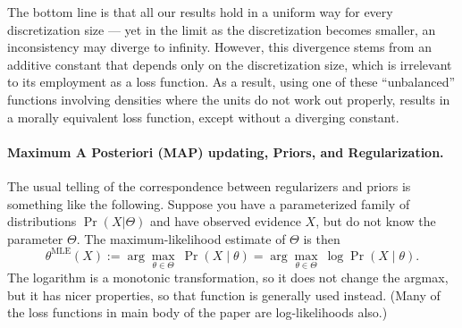 \begin{subappendices}
The bottom line is that all our results hold in a uniform way for every discretization size --- yet in the limit as the discretization becomes smaller, an inconsistency may diverge to infinity.
However, this divergence stems from an additive constant that depends only on the discretization size, which is irrelevant to its employment as a loss function.
As a result, using one of these ``unbalanced'' functions involving densities where the units do not work out properly, results in a morally equivalent loss function, except without a diverging constant.
%


\paragraph{Maximum A Posteriori (MAP) updating, Priors, and Regularization.}
    \label{appendix:MAP-and-priors}

The usual telling of the correspondence between regularizers and priors is something like the following.
Suppose you have a parameterized family of distributions
$\Pr(X|\Theta)$
and have observed evidence $X$, but do not know the parameter $\Theta$.
The maximum-likelihood estimate of $\Theta$ is then
\[
	\theta^{\mathrm{MLE}}(X) := \arg\max_{\theta\in \Theta}~  \Pr(X \mid \theta)
		= \arg\max_{\theta\in \Theta} ~ \log \Pr(X \mid \theta).
\]
The logarithm is a monotonic transformation, so it does not change the argmax, but it has
nicer properties, so that function is generally used instead. (Many of the loss functions in main body of the paper are log-likelihoods also.)


\end{subappendices}
